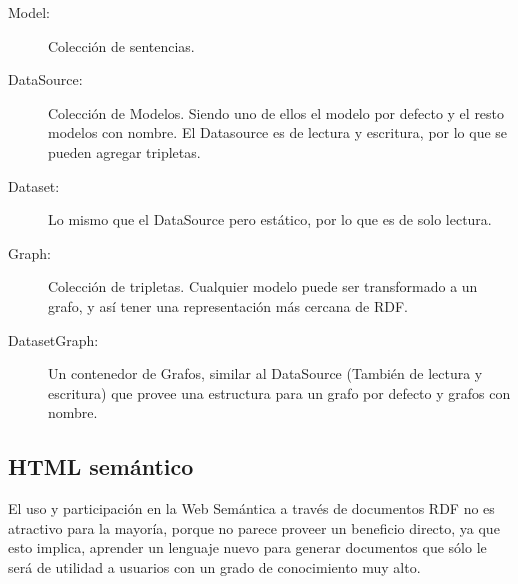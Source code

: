 \begin{description}
 \item[Model:] Colección de sentencias.

 \item[DataSource:] Colección de Modelos. Siendo uno de ellos el modelo por defecto y el resto modelos con nombre. El Datasource es de lectura y escritura, por lo que se pueden agregar tripletas.

 \item[Dataset:] Lo mismo que el DataSource pero estático, por lo que es de solo lectura.

 \item[Graph:] Colección de tripletas. Cualquier modelo puede ser transformado a un grafo, y así tener una representación más cercana de RDF.

 \item[DatasetGraph:] Un contenedor de Grafos, similar al DataSource (También de lectura y escritura) que provee una estructura para un grafo por defecto y grafos con nombre.
\end{description}

\subsection{HTML semántico}

El uso y participación en la Web Semántica a través de documentos RDF no es atractivo para la mayoría, porque no parece proveer un beneficio 
directo, ya que esto implica, aprender un lenguaje nuevo para generar documentos que sólo le será de utilidad a usuarios con un grado de conocimiento 
muy alto. 

